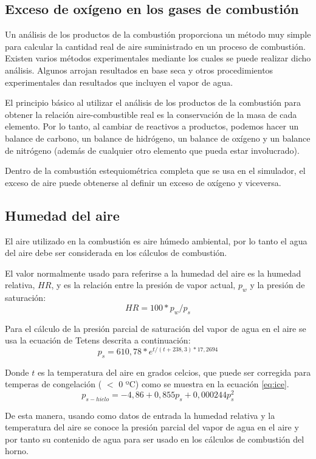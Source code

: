 \subsection{Exceso de oxígeno en los gases de combustión}
\par Un análisis de los productos de la combustión proporciona un método muy simple para calcular la cantidad real de aire suministrado en un proceso de combustión. Existen varios métodos experimentales mediante los cuales se puede realizar dicho análisis. Algunos arrojan resultados en base seca y otros procedimientos experimentales dan resultados que incluyen el vapor de agua. 
\par El principio básico al utilizar el análisis de los productos de la combustión para obtener la relación aire-combustible real es la conservación de la masa de cada elemento. Por lo tanto, al cambiar de reactivos a productos, podemos hacer un balance de carbono, un balance de hidrógeno, un balance de oxígeno y un balance de nitrógeno (además de cualquier otro elemento que pueda estar involucrado).
\par Dentro de la combustión estequiométrica completa que se usa en el simulador, el exceso de aire puede obtenerse al definir un exceso de oxígeno y viceversa. 

\subsection{Humedad del aire}
\par El aire utilizado en la combustión es aire húmedo ambiental, por lo tanto el agua del aire debe ser considerada en los cálculos de combustión.
\par El valor normalmente usado para referirse a la humedad del aire es la humedad relativa, $HR$, y es la relación entre la presión de vapor actual, $p_w$ y la presión de saturación:
\begin{equation}
    HR = 100 * p_w/p_s
\end{equation}
\par Para el cálculo de la presión parcial de saturación del vapor de agua en el aire se usa la ecuación de Tetens \cite{bib:tetens} descrita a continuación:
\begin{equation}
    p_s = 610,78 * e^{t/(t +238,3)*17,2694}
\end{equation}
\par Donde $t$ es la temperatura del aire en grados celcios, que puede ser corregida para temperas de congelación ( $<$ 0 ºC) como se muestra en la ecuación \ref{eq:ice}.
\begin{equation}
\label{eq:ice}
    p_{s-hielo} = -4,86 + 0,855p_s + 0,000244p_s^2
\end{equation}
\par De esta manera, usando como datos de entrada la humedad relativa y la temperatura del aire se conoce la presión parcial del vapor de agua en el aire y por tanto su contenido de agua para ser usado en los cálculos de combustión del horno.

